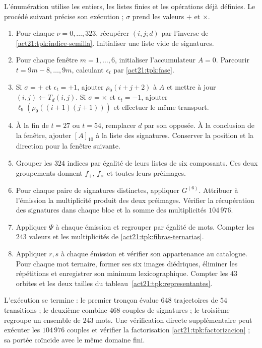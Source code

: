 L'énumération utilise les entiers, les listes finies et les opérations déjà définies.  
Le procédé suivant précise son exécution ; \(\sigma\) prend les valeurs  
\(+\) et \(\times\).

\begin{enumerate}
\item Pour chaque \(\nu=0,\ldots,323\), récupérer \((i,j;d)\) par
l'inverse de \eqref{act21:tpk:indice-semilla}. Initialiser une liste vide de signatures.
\item Pour chaque fenêtre \(m=1,\ldots,6\), initialiser l'accumulateur \(A=0\).
Parcourir \(t=9m-8,\ldots,9m\), calculant \(\epsilon_t\) par
\eqref{act21:tpk:fase}.
\item Si \(\sigma=+\) et \(\epsilon_t=+1\), ajouter
\(\rho_9(i+j+2)\) à \(A\) et mettre à jour
\((i,j)\leftarrow T_d(i,j)\). Si \(\sigma=\times\) et
\(\epsilon_t=-1\), ajouter
\(\ell_9(\rho_9((i+1)(j+1)))\) et effectuer le même transport.
\item À la fin de \(t=27\) ou \(t=54\), remplacer \(d\) par son opposée.  
À la conclusion de la fenêtre, ajouter \([A]_{10}\) à la liste des signatures.  
Conserver la position et la direction pour la fenêtre suivante.
\item Grouper les \(324\) indices par égalité de leurs listes de six
composants. Ces deux groupements donnent \(f_+\), \(f_\times\) et toutes
leurs préimages.
\item Pour chaque paire de signatures distinctes, appliquer \(G^{(6)}\).
Attribuer à l'émission la multiplicité produit des deux préimages.
Vérifier la récupération des signatures dans chaque bloc et la somme des
multiplicités \(104\,976\).
\item Appliquer \(\Psi\) à chaque émission et regrouper par égalité de mots.
Compter les \(243\) valeurs et les multiplicités de
\eqref{act21:tpk:fibras-ternarias}.
\item Appliquer \(r,s\) à chaque émission et vérifier son appartenance au catalogue.
Pour chaque mot ternaire, former ses six images diédriques, éliminer les
répétitions et enregistrer son minimum lexicographique. Compter les \(43\)
orbites et les deux tailles du tableau~\ref{act21:tpk:representantes}.
\end{enumerate}

L'exécution se termine : le premier tronçon évalue \(648\) trajectoires de \(54\) transitions ; le deuxième combine \(468\) couples de signatures ; le troisième regroupe un ensemble de \(243\) mots. Une vérification directe supplémentaire peut exécuter les \(104\,976\) couples et vérifier la factorisation \eqref{act21:tpk:factorizacion} ; sa portée coïncide avec le même domaine fini.


